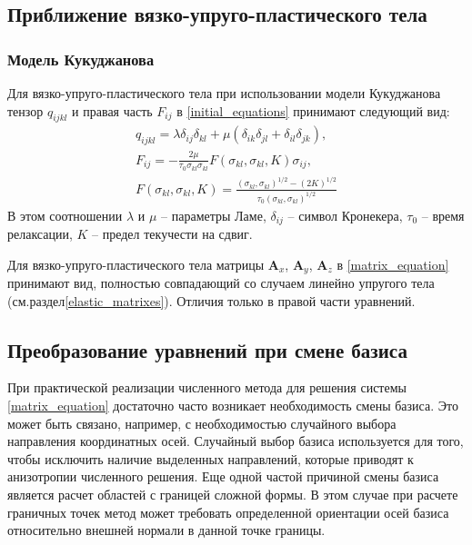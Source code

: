 \subsection{Приближение вязко-упруго-пластического тела}

\subsubsection{Модель Кукуджанова}
\label{kukudzhanov_matrixes}

Для вязко-упруго-пластического тела при использовании модели Кукуджанова тензор $q_{ijkl}$ и правая часть $F_{ij}$ в \ref{initial_equations} принимают следующий вид:
\begin{eqnarray}
\label{tensor_qijkl_kukudzhanov}
q_{ijkl}=\lambda\delta_{ij}\delta_{kl}+\mu(\delta_{ik}\delta_{jl}+\delta_{il}
\delta_{jk}),\nonumber\\
F_{ij}=-\frac{2\mu}{\tau_0\sigma_{kl}\sigma_{kl}} F(\sigma_{kl},\sigma_{kl},K)\sigma_{ij},\nonumber\\
F(\sigma_{kl},\sigma_{kl},K) = \frac{(\sigma_{kl},\sigma_{kl})^{1/2}-(2K)^{1/2}}{\tau_0(\sigma_{kl},\sigma_{kl})^{1/2}}
\end{eqnarray}
В этом соотношении $\lambda$ и $\mu$ -- параметры Ламе, $\delta_{ij}$ -- символ Кронекера, $\tau_0$ -- время релаксации, $K$ -- предел текучести на сдвиг.

Для вязко-упруго-пластического тела матрицы $\mathbf{A}_x$, $\mathbf{A}_y$, $\mathbf{A}_z$ в \ref{matrix_equation} принимают вид, полностью совпадающий со случаем линейно упругого тела (см.раздел\ref{elastic_matrixes}). Отличия только в правой части уравнений.


\clearpage
\newpage

\subsection{Преобразование уравнений при смене базиса}

При практической реализации численного метода для решения системы \ref{matrix_equation} достаточно часто возникает необходимость смены базиса. Это может быть связано, например, с необходимостью случайного выбора направления координатных осей. Случайный выбор базиса используется для того, чтобы исключить наличие выделенных направлений, которые приводят к анизотропии численного решения. Еще одной частой причиной смены базиса является расчет областей с границей сложной формы. В этом случае при расчете граничных точек метод может требовать определенной ориентации осей базиса относительно внешней нормали в данной точке границы.

